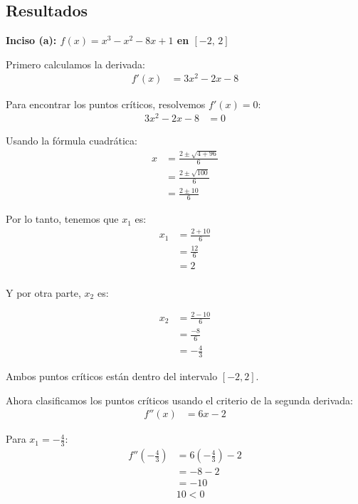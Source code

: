 \documentclass{article}
\begin{document}
\subsection{Resultados}
\setcounter{equation}{0}

\textbf{Inciso (a): $f(x) = x^{3} - x^{2} - 8x + 1$ en $[-2,\,2]$}

Primero calculamos la derivada:
\begin{align}
f'(x) &= 3x^{2} - 2x - 8
\end{align}

Para encontrar los puntos críticos, resolvemos $f'(x) = 0$:
\begin{align}
3x^{2} - 2x - 8 &= 0
\end{align}

Usando la fórmula cuadrática:
\begin{align}
x &= \frac{2 \pm \sqrt{4 + 96}}{6} \\
&= \frac{2 \pm \sqrt{100}}{6} \\
&= \frac{2 \pm 10}{6}
\end{align}

Por lo tanto, tenemos que $x_1$ es:
\begin{align}
x_{1} &= \frac{2 + 10}{6} \\
&= \frac{12}{6} \\
&= 2 \\
\end{align}

Y por otra parte, $x_2$ es:

\begin{align}
    x_{2} &= \frac{2 - 10}{6} \\
    &= \frac{-8}{6} \\
    &= -\frac{4}{3}
\end{align}

Ambos puntos críticos están dentro del intervalo $[-2, 2]$.

Ahora clasificamos los puntos críticos usando el criterio de la segunda derivada:
\begin{align}
f''(x) &= 6x - 2
\end{align}

Para $x_1 = -\frac{4}{3}$:
\begin{align}
f''\left(-\frac{4}{3}\right) &= 6\left(-\frac{4}{3}\right) - 2 \\
&= -8 - 2 \\
&= -10 \\
&10 < 0
\end{align}
\end{document}
